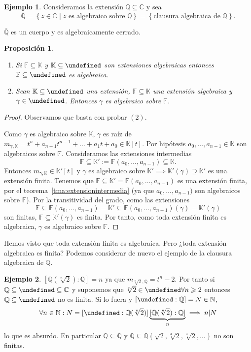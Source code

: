 \documentclass[10pt, spanish]{report}
\newtheorem{prop}[tma]{Proposición}
\theoremstyle{definition}
\newtheorem*{ej}{Ejemplo}
\theoremstyle{custom}
\theoremstyle{remark}
\newcommand{\N}{\mathbb{N}}
\newcommand{\Q}{\mathbb{Q}}
\newcommand{\C}{\mathbb{C}}
\newcommand{\F}{\mathbb{F}}
\newcommand{\K}{\mathbb{K}}
\let\L\undefined
\newcommand{\L}{\mathbb{L}}
\renewcommand{\geq}{\geqslant}
\newcommand{\fecha}[1]{\marginpar{\underline{\footnotesize{#1}}}}
\begin{document}
\begin{ej}
    Consideramos la extensión $\Q\subseteq\C$ y sea \[\overline{\Q}=\left\{ z\in
    \C\mid z\text{ es algebraico sobre }\Q\right\}=\left\{ \text{clausura
    algebraica de }\Q\right\}.\]

    $\overline{\Q}$ es un cuerpo y es algebraicamente cerrado.
\end{ej}

\fecha{2/03}
\begin{prop}\hspace{0pt}
    \begin{enumerate}
        \item Si $\F\subseteq\K$ y $\K\subseteq\L$ son extensiones algebraicas entonces
    $\F\subseteq\L$ es algebraica.
        \item Sean $\K\subseteq\L$ una extensión, $\F\subseteq\K$ una extensión
            algebraica y $\gamma\in\L$. Entonces $\gamma$ es algebraico sobre
            $\F$.
    \end{enumerate}
\end{prop}

\begin{proof}
        Observamos que basta con probar $(2)$.

        Como $\gamma$ es algebraico sobre $\K$, $\gamma$ es raíz de
        $m_{\gamma,\K}=t^n+a_{n-1}t^{n-1}+\ldots+a_1t+a_0\in\K[t]$. Por
        hipótesis $a_0,\ldots,a_{n-1}\in \K$ son algebraicos sobre $\F$.
        Consideramos las extensiones intermedias
        \[\F\subseteq\K':=\F(a_0,\ldots,a_{n-1})\subseteq\K.\]
        Entonces $m_{\gamma,\K}\in \K'[t]$ y $\gamma$  es
        algebraico sobre $\K' \implies \K'(\gamma)\supseteq \K'$ es una
        extensión finita. Tenemos que $\F\subseteq\K'=\F(a_0,\ldots,a_{n-1})$ es
        una extensión finita, por el teorema~\ref{tma:extensionintermedia} (ya
        que $a_0,\ldots,a_{n-1})$ son algebraicos sobre $\F$). Por la
        transitividad del grado, como las extensiones
        \[\F\subseteq\F(a_0,\ldots,a_{n-1})=\K'\subseteq\F(a_0,\ldots,a_{n-1})
        (\gamma)=\K'(\gamma)\] son finitas, $\F\subseteq\K'(\gamma)$ es finita.
        Por tanto, como toda extensión finita es algebraica, $\gamma$ es
        algebraico sobre $\F$.
\end{proof}

Hemos visto que toda extensión finita es algebraica. Pero ¿toda extensión
algebraica es finita? Podemos considerar de nuevo el ejemplo de la clausura
algebraica de $\Q$.

\begin{ej}
    $[\Q(\sqrt[n]{2}):\Q]=n$ ya que $m_{\sqrt[n]{2} ,\Q}=t^n-2$. Por tanto si
    $\Q\subseteq\L\subseteq\C$ y suponemos que $\sqrt[n]{2}\in\L\forall n\geq2$
    entonces $\Q\subseteq\L$ no es finita. Si lo fuera y $[\L:\Q]=N\in\N$,
    \[\forall n\in \N: N=[\L:\Q(\sqrt[n]{2})]\underbrace{[\Q(\sqrt[n]{2}):
        \Q]}_{n}\implies n|N\] lo que es absurdo. En particular
        $\Q\subseteq\overline{\Q}$ y $\Q\subseteq\Q(\sqrt{2},\sqrt[3]{2},
        \sqrt[4]{2},\ldots)$ no son finitas.
\end{ej}
\end{document}
